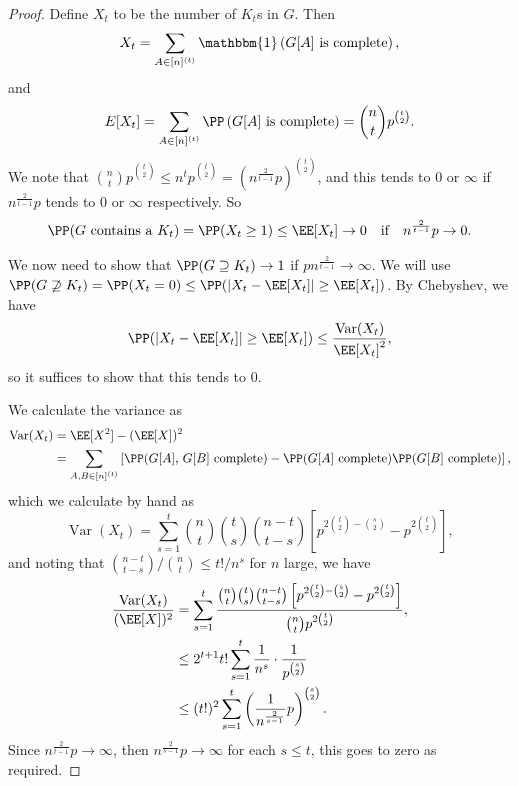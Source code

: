 \documentclass[a4paper]{scrartcl}
\begin{document}
\begin{proof}
	Define $X_t$ to be the number of $K_t$s in $G$. Then
	$$
	X_t = \sum_{A \in [n]^{(t)}} \mathbbm{1}\left(G[A] \text{ is complete}\right),
	$$
	and
	$$
	E[X_t] = \sum_{A \in [n]^{(t)}} \PP\left(G[A] \text{ is complete}\right) = \binom{n}{t}p^{\binom{t}{2}}.
	$$
	We note that $\binom{n}{t}p^{\binom{t}{2}} \leq n^t p^{\binom{t}{2}} =\left(n^{\frac{2}{t - 1}}p\right)^{\binom{t}{2}}$, and this tends to 0 or $\infty$ if $n^{\frac{2}{t - 1}}p$ tends to $0$ or $\infty$ respectively.
	So
	$$
\PP(\text{$G$ contains a $K_t$}) = \PP(X_t \geq 1)\leq \EE[X_t] \rightarrow 0 \quad \text{if} \quad n^{\frac{2}{t - 1}}p \rightarrow 0.
	$$

	We now need to show that $\PP(G \supseteq K_t) \rightarrow 1$ if $pn^{\frac{2}{t - 1}} \rightarrow \infty$. We will use $\PP(G \not \supseteq K_t) = \PP(X_t = 0) \leq \PP(|X_t - \EE[X_t]| \geq \EE[X_t])$. By Chebyshev, we have
	$$
	\PP(|X_t - \EE[X_t]| \geq \EE[X_t]) \leq \frac{\operatorname{Var}(X_t)}{\EE[X_t]^2},
	$$
	so it suffices to show that this tends to 0.

	We calculate the variance as
	\begin{align*}
		\operatorname{Var}(X_t) &= \EE[X^2] - (\EE[X])^2 \\
		&= \sum_{A, B \in [n]^{(t)}} \left[\PP(\text{$G[A]$, $G[B]$ complete}) - \PP(\text{$G[A]$ complete}) \PP(\text{$G[B]$ complete})\right],
	\end{align*}
	which we calculate by hand as
	$$
	\operatorname{Var}(X_t) = \sum_{s = 1}^t \binom{n}{t}\binom{t}{s} \binom{n - t}{t - s}\left[p^{2\binom{t}{2} - \binom{s}{2}} - p^{2 \binom{t}{2}}\right],
	$$
	and noting that $\binom{n - t}{t - s} / \binom{n}{t} \leq t!/n^s$ for $n$ large, we have
\begin{align*}
	\frac{\operatorname{Var}(X_t)}{(\EE[X])^2} &= \sum_{s = 1}^t \frac{\binom{n}{t}\binom{t}{s} \binom{n - t}{t - s}\left[p^{2\binom{t}{2} - \binom{s}{2}} - p^{2 \binom{t}{2}}\right]}{\binom{n}{t} p^{2\binom{t}{2}}}, \\
	&\leq 2^{t+1} t! \sum_{s = 1}^t \frac{1}{n^s}\cdot \frac{1}{p^{\binom{s}{2}}} \\
	&\leq (t!)^2 \sum_{s = 1}^t  \left(\frac{1}{n^{\frac{2}{s - 1}}}p\right)^{\binom{s}{2}}.
\end{align*}
Since $n^{\frac{2}{t - 1}}p \rightarrow \infty$, then $n^{\frac{2}{s - 1}}p \rightarrow \infty$ for each $s \leq t$, this goes to zero as required.
\end{proof}
\end{document}
